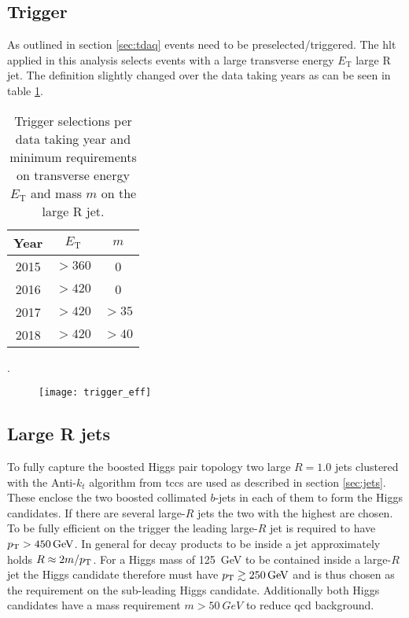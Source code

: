 \subsection{Trigger}
As outlined in section \ref{sec:tdaq} events need to be preselected/triggered. The \ac{hlt} applied in this analysis selects events with a large transverse energy $E_\text{T}$ large R jet. The definition slightly changed over the data taking years as can be seen in table \ref{tab:trigger}.
\begin{table}[htbp]
    \centering
    \caption{Trigger selections per data taking year and minimum requirements on transverse energy $E_\text{T}$ and mass $m$ on the large R jet. }
    \begin{tabular}{ccc}
        \hline
        Year & $E_\text{T}$ & $m$   \\ \hline
        2015 & $>360$       & 0     \\
        2016 & $>420$       & 0     \\
        2017 & $>420$       & $>35$ \\
        2018 & $>420$       & $>40$ \\ \hline
    \end{tabular}
    \label{tab:trigger}
\end{table}
.
\begin{figure}
    \centering
    \texttt{[image: trigger\_eff]}
    \caption[]{}
    \label{fig:trigger_eff}
\end{figure}

\subsection{Large R jets}
To fully capture the boosted Higgs pair topology two large $R=1.0$ jets clustered with the Anti-$k_t$ algorithm from \acp{tcc} are used as described in section \ref{sec:jets}. These enclose the two boosted collimated $b$-jets in each of them to form the Higgs candidates. If there are several large-$R$ jets the two with the highest \pt are chosen. To be fully efficient on the trigger the leading large-$R$ jet is required to have $p_{\text{T}}>\qty[]{450}{GeV}$. In general for decay products to be inside a jet approximately holds $R\approx 2m/p_{\text{T}}$. For a Higgs mass of \qty[]{125}{GeV} to be contained inside a large-$R$ jet the Higgs candidate therefore must have $p_{\text{T}}\gtrsim \qty[]{250}{GeV}$ and is thus chosen as the \pt requirement on the sub-leading Higgs candidate. Additionally both Higgs candidates have a mass requirement $m>\qty[]{50}{GeV}$ to reduce \ac{qcd} background. 

